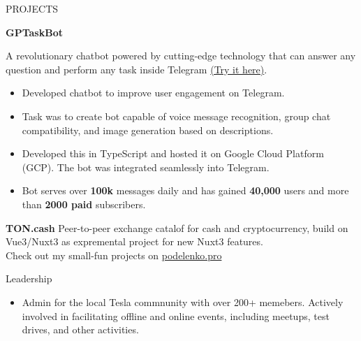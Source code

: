 \documentclass{template} %
\begin{document}
\begin{rSection}{PROJECTS}
\vspace{-1.25em}
\item \textbf{GPTaskBot} {A revolutionary chatbot powered by cutting-edge technology that can answer any question and perform any task inside Telegram \href{https://gptask.io/}{(Try it here)}.
    \begin{itemize}
        \itemsep -3pt {} 
        \item Developed chatbot to improve user engagement on Telegram.
        \item Task was to create bot capable of voice message recognition, group chat
compatibility, and image generation based on descriptions.
        \item Developed this in TypeScript and hosted it on Google Cloud Platform (GCP). The bot was integrated seamlessly into Telegram.
        \item Bot serves over \textbf{100k} messages daily and has gained \textbf{40,000} users and more than \textbf{2000 paid} subscribers.
    \end{itemize}
}
\item \textbf{TON.cash} {Peer-to-peer exchange catalof for cash and cryptocurrency, build on Vue3/Nuxt3 as expremental project for new Nuxt3 features.}\\ 
Check out my small-fun projects on \href{https://podelenko.pro/#fun}{podelenko.pro}
\end{rSection} 


\begin{rSection}{Leadership} 
\begin{itemize}
    \item Admin for the local Tesla commnunity with over 200+ memebers. Actively involved in facilitating offline and online events, including meetups, test drives, and other activities.
\end{itemize}


\end{rSection}
\end{document}
